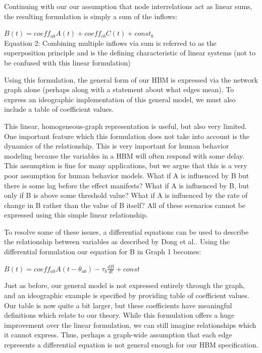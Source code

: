 \documentclass[runningheads,a4paper]{llncs}
\begin{document}
Continuing with our our assumption that node interrelations act as linear sums, the resulting formulation is simply a sum of the inflows:

\begin{centering}
$B(t) = coeff_{ab}A(t) + coeff_{cb}C(t) + const_b$\\
\small{Equation 2: Combining multiple inflows via sum is referred to as the superposition principle and is the defining characteristic of linear systems (not to be confused with this linear formulation)}
\end{centering}

Using this formulation, the general form of our HBM is expressed via the network graph alone (perhaps along with a statement about what edges mean).
To express an ideographic implementation of this general model, we must also include a table of coefficient values. 

This linear, homogeneous-graph representation is useful, but also very limited.
One important feature which this formulation does not take into account is the dynamics of the relationship.
This is very important for human behavior modeling because the variables in a HBM will often respond with some delay.
This assumption is fine for many applications, but we argue that this is a very poor assumption for human behavior models. What if A is influenced by B but there is some lag before the effect manifests?
What if A is influenced by B, but only if B is above some threshold value? What if A is influenced by the rate of change in B rather than the value of B itself? All of these scenarios cannot be expressed using this simple linear relationship. 

To resolve some of these issues, a differential equations can be used to describe the relationship between variables as described by Dong et al.\cite{dong2012dynamical}. 
Using the differential formulation our equation for B in Graph 1 becomes:

\begin{centering}
$B(t) = coeff_{ab}A(t-\theta_{ab}) - \tau_{b}\frac{dB}{dt} + const$\\
\end{centering}

Just as before, our general model is not expressed entirely through the graph, and an ideographic example is specified by providing table of coefficient values.
Our table is now quite a bit larger, but these coefficients have meaningful definitions which relate to our theory.
While this formulation offers a huge improvement over the linear formulation, we can still imagine relationships which it cannot express.
Thus, perhaps a graph-wide assumption that each edge represents a differential equation is not general enough for our HBM specification. 
\end{document}

